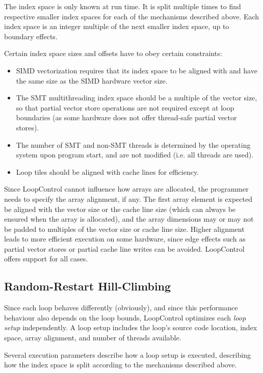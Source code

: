 \documentclass[conference]{IEEEtran}
\begin{document}
The index space is only known at run time. It is split multiple times
to find respective smaller index spaces for each of the mechanisms
described above. Each index space is an integer multiple of the next
smaller index space, up to boundary effects.

Certain index space sizes and offsets have to obey certain constraints:
\begin{itemize}
  \item SIMD vectorization requires that its index space to be aligned with
    and have the same size as the SIMD hardware vector size.
  \item The SMT multithreading index space should be a multiple of the
    vector size, so that partial vector store operations are not
    required except at loop boundaries (as some hardware does not offer
    thread-safe partial vector stores).
  \item The number of SMT and non-SMT threads is determined by the
    operating system upon program start, and are not modified (i.e.
    all threads are used).
  \item Loop tiles should be aligned with cache lines for efficiency.
\end{itemize}

Since LoopControl cannot influence how arrays are allocated, the
programmer needs to specify the array alignment, if any. The first
array element is expected be aligned with the vector size or the
cache line size (which can always be ensured when the array is
allocated), and the array dimensions may or may not be padded to
multiples of the vector size or cache line size. Higher alignment leads
to more efficient execution on some hardware, since edge effects such
as partial vector stores or partial cache line writes can be avoided.
LoopControl offers support for all cases.

\subsection{Random-Restart Hill-Climbing}

Since each loop behaves differently (obviously), and since this
performance behaviour also depends on the loop bounds, LoopControl
optimizes each \emph{loop setup} independently. A loop setup includes
the loop's source code location, index space, array alignment, and number of
threads available.

Several execution parameters describe how a loop setup is executed,
describing how the index space is split according to
the mechanisms described above.
\end{document}
